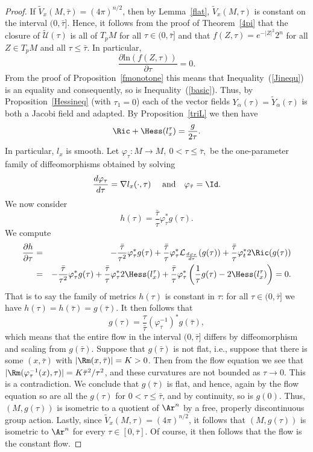 \begin{proof}\sketch
{}
If $\widetilde V_x(M,\bar\tau)=(4\pi)^{n/2}$, then by
Lemma~\ref{flat}, $\widetilde V_x(M,\tau)$ is constant on the
interval $(0,\bar\tau]$. Hence, it follows from the proof of
Theorem~\ref{4pi} that the closure of $\widetilde{\mathcal U}(\tau)$
is all of $T_pM$ for all $\tau\in (0,\bar\tau]$ and that
$f(Z,\tau)=e^{-|Z|^2}2^n$ for all $Z\in T_pM$ and all $\tau\le
\bar\tau$. In particular,
$$\frac{\partial \mathrm{ln}(f(Z,\tau))}{\partial \tau}=0.$$
From the proof of
 Proposition~\ref{fmonotone} this means that
Inequality~(\ref{Jinequ}) is an equality and consequently, so is
Inequality~(\ref{basic}). Thus, by Proposition~\ref{Hessineq}
 (with $\tau_1=0$) each of the vector fields $Y_\alpha(\tau)=\tilde
Y_\alpha(\tau)$ is both a Jacobi field and adapted. By
Proposition~\ref{triL} we then have
$$\Ric+\Hess(l^\tau_x)=\frac{g}{2\tau}.$$
In particular, $l_x$ is smooth. Let $\varphi_\tau\colon M\to M,\
0<\tau\le \bar\tau$,\ be the one-parameter family of diffeomorphisms
obtained by solving
$$\frac{d\varphi_\tau}{d\tau}=\nabla
l_x(\cdot,\tau)\ \ \ \ \mathrm{and} \ \ \ \varphi_{\bar\tau}=\Id.$$ We now consider
$$h(\tau)=\frac{\bar\tau}{\tau}\varphi_\tau^*g(\tau).$$
We compute \begin{eqnarray*}\frac{\partial h}{\partial \tau} & = &
-\frac{\bar\tau}{\tau^2}\varphi_\tau^*g(\tau)
+\frac{\bar\tau}{\tau}\varphi_\tau^*{\mathcal
L}_{\frac{d\varphi_\tau}{d\tau}}(g(\tau))
+\frac{\bar\tau}{\tau}\varphi_t^*2\Ric(g(\tau)) \\
& = & -\frac{\bar\tau}{\tau^2}\varphi_\tau^*g(\tau) +
\frac{\bar\tau}{\tau}\varphi_\tau^*2\Hess(l_x^\tau)+\frac{\bar\tau}{\tau}
\varphi_\tau^*\left(\frac{1}{\tau}g(\tau)-2\Hess(l_x^\tau)\right)=0.\end{eqnarray*} That is to say the family
of metrics $h(\tau)$ is  constant in $\tau$: for all $\tau\in
(0,\bar\tau]$ we have $h(\tau)=h(\bar\tau)=g(\bar\tau)$. It then
follows that
$$g(\tau)=\frac{\tau}{\bar\tau}(\varphi_\tau^{-1})^*g(\bar\tau),$$
which means that the entire flow in the interval $(0,\bar\tau]$
differs by diffeomorphism and scaling from $g(\bar\tau)$. Suppose
that $g(\bar\tau)$ is not flat, i.e., suppose that there is some
$(x,\bar\tau)$ with $|\Rm(x,\bar\tau)|=K>0$. Then from the flow
equation we see that $|\Rm(\varphi^{-1}_\tau(x),\tau)|=K\bar\tau^2/\tau^2$, and these
curvatures are not bounded as $\tau\rightarrow 0$. This is a
contradiction. We conclude that $g(\bar\tau)$ is flat, and hence,
again by the flow equation so are all the $g(\tau)$ for $0<\tau\le
\bar\tau$, and by continuity, so is $g(0)$. Thus, $(M,g(\tau))$ is
isometric to a quotient of $\Ar^n$ by a free, properly discontinuous
group action. Lastly, since $\widetilde V_x(M,\tau)=(4\pi)^{n/2}$,
it follows that $(M,g(\tau))$ is isometric to $\Ar^n$ for every
$\tau\in [0,\bar\tau]$. Of course, it then follows that the flow is
the constant flow.
\end{proof}
